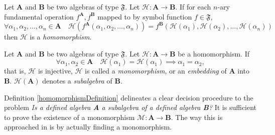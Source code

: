 \documentclass{mcom-l}
\begin{document}
\begin{definition}\cite{burris1981course} 
Let \textbf{A} and \textbf{B} be two algebras of type $\mathfrak{F}$. Let $\mathcal{H} : \mathbf{A} \to \mathbf{B}$.\newline
If for each $n$-ary fundamental operation $f^\mathbf{A},f^\mathbf{B}$ mapped to by symbol function $f \in \mathfrak{F}$,
\[\forall \alpha_1,\alpha_2,\dots,\alpha_n \in \mathbf{A} \quad \mathcal{H}(f^{\mathbf{A}}(\alpha_1,\alpha_2,\dots,\alpha_n)) = f^{\mathbf{B}}(\mathcal{H}(\alpha_1),\mathcal{H}(\alpha_2),\dots, \mathcal{H}(\alpha_n))\]
then $\mathcal{H}$ is a \emph{homomorphism}.
\end{definition}

\begin{definition}\label{homomorphismDefinition}\cite{burris1981course} 
Let \textbf{A} and \textbf{B} be two algebras of type $\mathfrak{F}$. Let $\mathcal{H} : \mathbf{A} \to \mathbf{B}$ be a homomorphism. If
\[\forall \alpha_1, \alpha_2 \in \mathbf{A} \quad \mathcal{H}(\alpha_1) = \mathcal{H}(\alpha_1) \implies \alpha_1 = \alpha_2,\]
that is, $\mathcal{H}$ is injective, $\mathcal{H}$ is called a \emph{monomorphism}, or an \emph{embedding} of \textbf{A} into \textbf{B}. $\mathcal{H}(\mathbf{A})$ denotes a \emph{subalgebra} of \textbf{B}.
\end{definition}

\noindent Definition \ref{homomorphismDefinition} delineates a clear decision procedure to the problem \textit{Is a defined algebra \textbf{A} a subalgebra of a defined algebra \textbf{B}?} It is sufficient to prove the existence of a monomorphism $\mathcal{M}: \mathbf{A}\to \mathbf{B}$.\newline
The way this is approached in \Software is by actually finding a monomorphism.
\end{document}
